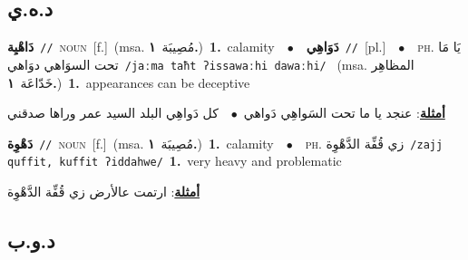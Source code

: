 \documentclass[10pt,a4paper,twoside]{article} %
\begin{document}
\begin{multicols}{2}
\vspace{-3mm}
\subsection*{\color{blue}\foreignlanguage{arabic}{د.ه.ي}\color{blue}{}} 

{\setlength\topsep{0pt}\textbf{\foreignlanguage{arabic}{دَاهْيِة}}\ {\color{gray}\texttt{//}\color{black}}\ \textsc{noun}\ [f.]\ \color{gray}(msa. \foreignlanguage{arabic}{مُصِيبَة}~\foreignlanguage{arabic}{\textbf{١.}})\color{black}\ \textbf{1.}~calamity\ \ $\bullet$\ \ \setlength\topsep{0pt}\textbf{\foreignlanguage{arabic}{دَوَاهِي}}\ {\color{gray}\texttt{//}\color{black}}\ [pl.]\ \ $\bullet$\ \ \textsc{ph.} \color{gray} \foreignlanguage{arabic}{يَا مَا تحت السوَاهي دوَاهي}\color{black}\ {\color{gray}\texttt{/{\sffamily jaːma taħt ʔissawaːhi dawaːhi}/}\color{black}}\ \color{gray} (msa. \foreignlanguage{arabic}{المظاهِر خَدّاعَة}~\foreignlanguage{arabic}{\textbf{١.}})\color{black}\ \textbf{1.}~appearances can be deceptive\  \begin{flushright}\color{gray}\foreignlanguage{arabic}{\textbf{\underline{\foreignlanguage{arabic}{أمثلة}}}: عنجد يا ما تحت السَواهِي دَواهي\ $\bullet$\ \  كل دَواهِي البلد السيد عمر وراها صدقني}\end{flushright}\color{black}} \vspace{2mm}

{\setlength\topsep{0pt}\textbf{\foreignlanguage{arabic}{دَهْوِة}}\ {\color{gray}\texttt{//}\color{black}}\ \textsc{noun}\ [f.]\ \color{gray}(msa. \foreignlanguage{arabic}{مُصِيبَة}~\foreignlanguage{arabic}{\textbf{١.}})\color{black}\ \textbf{1.}~calamity\ \ $\bullet$\ \ \textsc{ph.} \color{gray} \foreignlanguage{arabic}{زي قُفِّة الدَّهْوِة}\color{black}\ {\color{gray}\texttt{/{\sffamily zajj quffit, kuffit ʔiddahwe}/}\color{black}}\ \textbf{1.}~very heavy and problematic\  \begin{flushright}\color{gray}\foreignlanguage{arabic}{\textbf{\underline{\foreignlanguage{arabic}{أمثلة}}}: ارتمت عالأرض زي قُفِّة الدَّهْوِة}\end{flushright}\color{black}} \vspace{2mm}

\vspace{-3mm}
\subsection*{\color{blue}\foreignlanguage{arabic}{د.و.ب}\color{blue}{}} 


\end{multicols}
\end{document}
